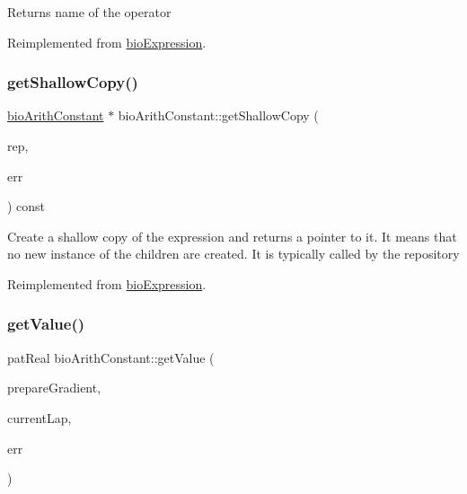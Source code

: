 \begin{DoxyReturn}{Returns}
name of the operator 
\end{DoxyReturn}


Reimplemented from \hyperlink{classbio_expression_a2353a4afb3a2b0af7c63aba086a72bde}{bio\+Expression}.

\mbox{\label{classbio_arith_constant_a521fe691fd4efd9f93ff95a0e478148d}} 
\subsubsection{\texorpdfstring{get\+Shallow\+Copy()}{getShallowCopy()}}
{\footnotesize\ttfamily \hyperlink{classbio_arith_constant}{bio\+Arith\+Constant} $\ast$ bio\+Arith\+Constant\+::get\+Shallow\+Copy (\begin{DoxyParamCaption}\item[{\hyperlink{classbio_expression_repository}{bio\+Expression\+Repository} $\ast$}]{rep,  }\item[{pat\+Error $\ast$\&}]{err }\end{DoxyParamCaption}) const\hspace{0.3cm}{\ttfamily [virtual]}}

Create a shallow copy of the expression and returns a pointer to it. It means that no new instance of the children are created. It is typically called by the repository 

Reimplemented from \hyperlink{classbio_expression_a442534762693b92baaf33928979a1bf8}{bio\+Expression}.

\mbox{\label{classbio_arith_constant_a60b9f8bf637586c0464356dfcf3bc4a3}} 
\subsubsection{\texorpdfstring{get\+Value()}{getValue()}}
{\footnotesize\ttfamily pat\+Real bio\+Arith\+Constant\+::get\+Value (\begin{DoxyParamCaption}\item[{pat\+Boolean}]{prepare\+Gradient,  }\item[{pat\+U\+Long}]{current\+Lap,  }\item[{pat\+Error $\ast$\&}]{err }\end{DoxyParamCaption})\hspace{0.3cm}{\ttfamily [virtual]}}

